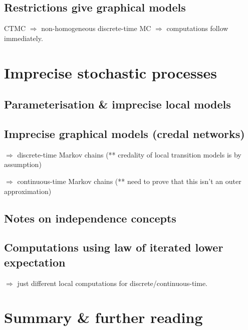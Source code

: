 \documentclass[11pt]{article}
\begin{document}
\subsection{Restrictions give graphical models}
CTMC $\Rightarrow$ non-homogeneous discrete-time MC $\Rightarrow$ computations follow immediately.
\vspace{-12pt}
\section{Imprecise stochastic processes}
\subsection{Parameterisation \& imprecise local models}
\subsection{Imprecise graphical models (credal networks)}
$\Rightarrow$ discrete-time Markov chains (** credality of local transition models is by assumption)

\noindent $\Rightarrow$ continuous-time Markov chains (** need to prove that this isn't an outer approximation)
\vspace{-12pt}
\subsection{Notes on independence concepts}
\subsection{Computations using law of iterated lower expectation}
$\Rightarrow$  just different local computations for discrete/continuous-time.
\vspace{-12pt}
\section{Summary \& further reading}
\end{document}
